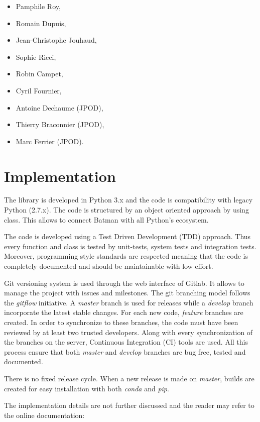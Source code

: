 \begin{itemize}
\item Pamphile Roy,
\item Romain Dupuis,
\item Jean-Christophe Jouhaud,
\item Sophie Ricci,
\item Robin Campet,
\item Cyril Fournier,
\item Antoine Dechaume (JPOD),
\item Thierry Braconnier (JPOD),
\item Marc Ferrier (JPOD).
\end{itemize}

\section{Implementation}

The library is developed in Python 3.x and the code is compatibility with legacy Python (2.7.x). The code is structured by an object oriented approach by using class. This allows to connect Batman with all Python's ecosystem.

The code is developed using a Test Driven Development (TDD) approach. Thus every function and class is tested by unit-tests, system tests and integration tests. Moreover, programming style standards are respected meaning that the code is completely documented and should be maintainable with low effort.

Git versioning system is used through the web interface of Gitlab. It allows to manage the project with issues and milestones. The git branching model follows the \emph{gitflow} initiative. A \emph{master} branch is used for releases while a \emph{develop} branch incorporate the latest stable changes. For each new code, \emph{feature} branches are created. In order to synchronize to these branches, the code must have been reviewed by at least two trusted developers. Along with every synchronization of the branches on the server, Continuous Integration (CI) tools are used. All this process ensure that both \emph{master} and \emph{develop} branches are bug free, tested and documented.

There is no fixed release cycle. When a new release is made on \emph{master}, builds are created for easy installation with both \emph{conda} and \emph{pip}.

The implementation details are not further discussed and the reader may refer to the online documentation: 

